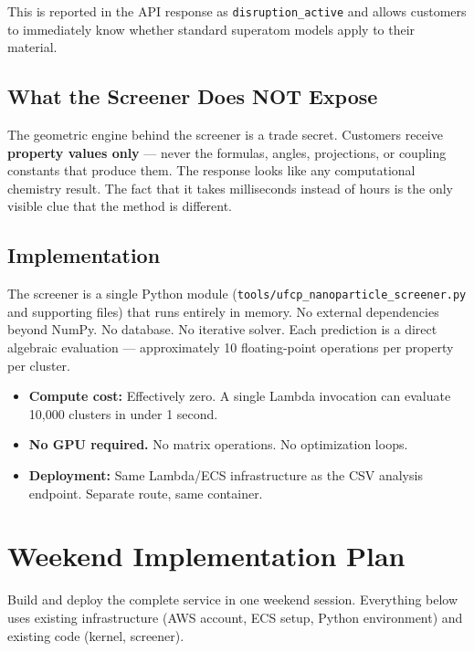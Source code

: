 \documentclass[11pt,letterpaper]{article}
\begin{document}
This is reported in the API response as \texttt{disruption\_active}
and allows customers to immediately know whether standard superatom
models apply to their material.

\subsection{What the Screener Does NOT Expose}

The geometric engine behind the screener is a trade secret.
Customers receive \textbf{property values only} --- never the
formulas, angles, projections, or coupling constants that produce
them. The response looks like any computational chemistry result.
The fact that it takes milliseconds instead of hours is the only
visible clue that the method is different.

\subsection{Implementation}

The screener is a single Python module
(\texttt{tools/ufcp\_nanoparticle\_screener.py} and supporting files)
that runs entirely in memory. No external dependencies beyond NumPy.
No database. No iterative solver. Each prediction is a direct
algebraic evaluation --- approximately 10 floating-point operations
per property per cluster.

\begin{itemize}
  \item \textbf{Compute cost:} Effectively zero. A single Lambda
    invocation can evaluate 10{,}000 clusters in under 1 second.
  \item \textbf{No GPU required.} No matrix operations. No
    optimization loops.
  \item \textbf{Deployment:} Same Lambda/ECS infrastructure as the
    CSV analysis endpoint. Separate route, same container.
\end{itemize}

\section{Weekend Implementation Plan}

Build and deploy the complete service in one weekend session.
Everything below uses existing infrastructure (AWS account, ECS
setup, Python environment) and existing code (kernel, screener).
\end{document}

